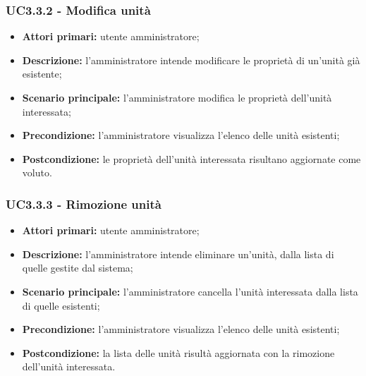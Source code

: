 \subsubsection{UC3.3.2 - Modifica unità}
\begin{itemize}
	\item \textbf{Attori primari:} utente amministratore;
	\item \textbf{Descrizione:} l'amministratore intende modificare le proprietà di un'unità già esistente;
	\item \textbf{Scenario principale:} l'amministratore modifica le proprietà dell'unità interessata;
	\item \textbf{Precondizione:} l'amministratore visualizza l'elenco delle unità esistenti;
	\item \textbf{Postcondizione:} le proprietà dell'unità interessata risultano aggiornate come voluto.
\end{itemize}

\subsubsection{UC3.3.3 - Rimozione unità}
\begin{itemize}
	\item \textbf{Attori primari:} utente amministratore;
	\item \textbf{Descrizione:} l'amministratore intende eliminare un'unità, dalla lista di quelle gestite dal sistema;
	\item \textbf{Scenario principale:} l'amministratore cancella l'unità interessata dalla lista di quelle esistenti;
	\item \textbf{Precondizione:} l'amministratore visualizza l'elenco delle unità esistenti;
	\item \textbf{Postcondizione:} la lista delle unità risultà aggiornata con la rimozione dell'unità interessata.
\end{itemize}